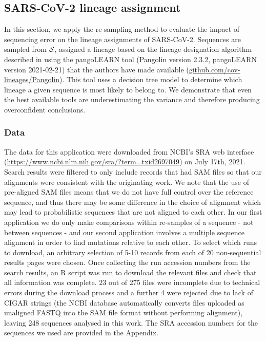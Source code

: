 \documentclass[12pt]{article}
\begin{document}
\subsection{SARS-CoV-2 lineage assignment}

In this section, we apply the re-sampling method to evaluate the impact of sequencing error on the lineage assignments of SARS-CoV-2.
Sequences are sampled from $\mathcal{S}$, assigned a lineage based on the lineage designation algorithm described in \cite{rambautDynamicNomenclatureProposal2020} using the pangoLEARN tool (Pangolin version 2.3.2, pangoLEARN version 2021-02-21) that the authors have made available (\url{github.com/cov-lineages/Pangolin}).
This tool uses a decision tree model to determine which lineage a given sequence is most likely to belong to.
We demonstrate that even the best available tools are underestimating the variance and therefore producing overconfident conclusions.

\subsubsection{Data}

The data for this application were downloaded from NCBI's SRA web interface (\url{https://www.ncbi.nlm.nih.gov/sra/?term=txid2697049}) on July 17th, 2021.
Search results were filtered to only include records that had SAM files so that our alignments were consistent with the originating work.
We note that the use of pre-aligned SAM files means that we do not have full control over the reference sequence, and thus there may be some difference in the choice of alignment which may lead to probabilistic sequences that are not aligned to each other.
In our first application we do only make comparisons within re-samples of a sequence - not between sequences - and our second application involves a multiple sequence alignment in order to find mutations relative to each other.
To select which runs to download, an arbitrary selection of 5-10 records from each of 20 non-sequential results pages were chosen.
Once collecting the run accession numbers from the search results, an R script was run to download the relevant files and check that all information was complete.
23 out of 275 files were incomplete due to technical errors during the download process and a further 4 were rejected due to lack of CIGAR strings (the NCBI database automatically converts files uploaded as unaligned FASTQ into the SAM file format without performing alignment), leaving 248 sequences analysed in this work. 
The SRA accession numbers for the sequences we used are provided in the Appendix. 
\end{document}
